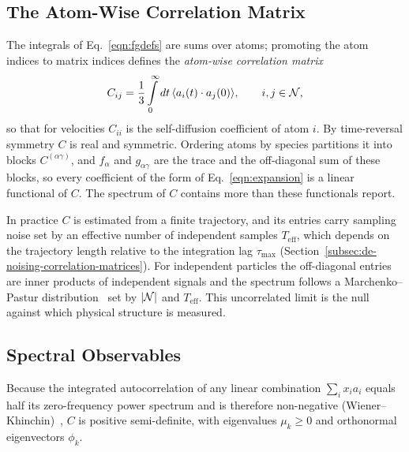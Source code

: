 \subsection{The Atom-Wise Correlation Matrix}
\label{subsec:atom-wise-correlation-matrix}
The integrals of Eq.~\eqref{eqn:fgdefs} are sums over atoms; promoting the atom indices to matrix indices defines the \emph{atom-wise correlation matrix}
\begin{align}
    C_{ij} = \frac{1}{3} \int\limits_{0}^{\infty} dt \, \langle a_{i}(t) \cdot a_{j}(0) \rangle, \qquad i, j \in \mathcal{N},
    \label{eqn:Cij}
\end{align}
so that for velocities $C_{ii}$ is the self-diffusion coefficient of atom $i$.
By time-reversal symmetry $C$ is real and symmetric.
Ordering atoms by species partitions it into blocks $C^{(\alpha\gamma)}$, and $f_{\alpha}$ and $g_{\alpha\gamma}$ are the trace and the off-diagonal sum of these blocks, so every coefficient of the form of Eq.~\eqref{eqn:expansion} is a linear functional of $C$.
The spectrum of $C$ contains more than these functionals report.

In practice $C$ is estimated from a finite trajectory, and its entries carry sampling noise set by an effective number of independent samples $T_{\text{eff}}$, which depends on the trajectory length relative to the integration lag $\tau_{\max}$ (Section~\ref{subsec:de-noising-correlation-matrices}).
For independent particles the off-diagonal entries are inner products of independent signals and the spectrum follows a Marchenko--Pastur distribution~\cite{marchenko1967} set by $|\mathcal{N}|$ and $T_{\text{eff}}$.
This uncorrelated limit is the null against which physical structure is measured.

\subsection{Spectral Observables}
\label{subsec:interpreting-atomic-correlation-matrices}
Because the integrated autocorrelation of any linear combination $\sum_{i} x_{i} a_{i}$ equals half its zero-frequency power spectrum and is therefore non-negative (Wiener--Khinchin)~\cite{hansen90a}, $C$ is positive semi-definite, with eigenvalues $\mu_{k} \geq 0$ and orthonormal eigenvectors $\phi_{k}$.

